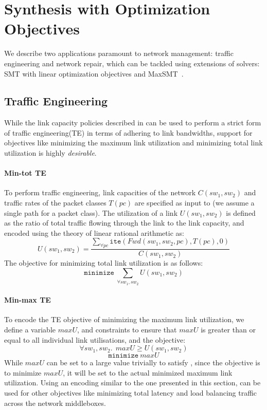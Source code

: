 \section{Synthesis with Optimization Objectives}
We describe two applications paramount to network management:
traffic engineering and network repair, which can be tackled using
extensions of solvers: SMT with linear optimization objectives and MaxSMT~\cite{maxsmt}.
\subsection{Traffic Engineering}
While the link capacity policies described in  can
be used to perform a strict form of traffic engineering(TE) in terms of 
adhering to link bandwidths, support for objectives
like minimizing the maximum link utilization and minimizing total link utilization
is highly \emph{desirable}.

\paragraph{Min-tot TE}
To perform traffic engineering, link capacities of the network $C(sw_1, sw_2)$ and traffic 
rates of the packet classes $T(pc)$ are specified as input to \name (we assume a single
path for a packet class). The utilization 
of a link $U(sw_1, sw_2)$ is defined as the ratio of total traffic flowing through the link to the 
link capacity, and encoded using the theory of linear rational arithmetic as:
\begin{equation}
U(sw_1, sw_2) = \frac{\sum_{\forall pc} \texttt{ite}(Fwd(sw_1,sw_2, pc), T(pc), 0)} {C(sw_1, sw_2)}
\end{equation}
The objective for minimizing total link utilization is as follows:
\begin{equation}
	\texttt{minimize}\ \sum_{\forall sw_1, sw_2} U(sw_1, sw_2)
\end{equation}
\paragraph{Min-max TE}
To encode the TE objective of minimizing the maximum link utilization, we define
a variable $maxU$, and constraints to ensure that $maxU$ is greater than or equal to all 
individual link utilisations, and the objective: 
\begin{equation} \label{eq:maxu}
\forall sw_1, sw_2.\ \ maxU \geq U(sw_1, sw_2)
\end{equation} 
\begin{equation}
		\texttt{minimize}\ maxU
\end{equation}
While $maxU$ can be set to a large value trivially to satisfy 
, since the objective is to minimize $maxU$, it will be set to the actual
minimized maximum link utilization. Using an encoding similar to the one presented in this section, \name can be used for other objectives like minimizing total latency and load balancing
traffic across the network middleboxes.

